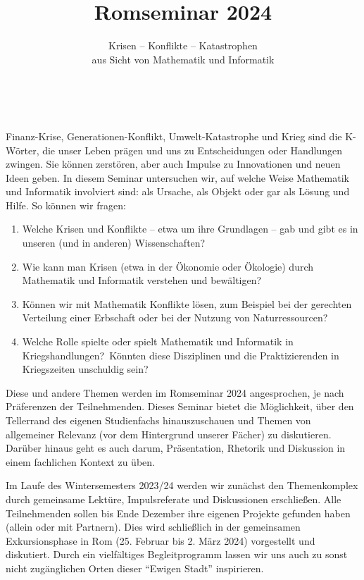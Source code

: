 \documentclass[%
	,ngerman				
	,DIV = 15				 
	]{scrartcl}
\title{Romseminar 2024}
\subtitle{Krisen -- Konflikte -- Katastrophen \\
aus Sicht von Mathematik und Informatik}
\date{}
\begin{document}
 
\maketitle


\thispagestyle{empty}
Finanz-Krise, Generationen-Konflikt, Umwelt-Katastrophe und Krieg sind die K-Wörter, die unser Leben prägen und uns zu Entscheidungen oder Handlungen zwingen. 
Sie können zerstören, aber auch Impulse zu Innovationen und neuen Ideen geben.
In diesem Seminar untersuchen wir, auf welche Weise Mathematik und Informatik involviert sind: als Ursache, als Objekt oder gar als Lösung und Hilfe. So können wir fragen:
%
\begin{enumerate}[$\bullet$]

\item
Welche Krisen und Konflikte -- etwa um ihre Grundlagen -- gab und gibt es in unseren (und in anderen) Wissenschaften? 

\item
Wie kann man Krisen (etwa in der Ökonomie oder Ökologie) durch Mathematik und Informatik verstehen und bewältigen?

\item
Können wir mit Mathematik Konflikte lösen, zum Beispiel bei der gerechten Verteilung einer Erbschaft oder bei der Nutzung von Naturressourcen?

\item
Welche Rolle spielte oder spielt Mathematik und Informatik in Kriegshandlungen? Könnten \mbox{diese} Disziplinen und die Praktizierenden in Kriegszeiten unschuldig sein?

\end{enumerate}
%
Diese und andere Themen werden im Romseminar 2024 angesprochen, je nach Präferenzen der Teilnehmenden. Dieses Seminar bietet die Möglichkeit, über den Tellerrand des eigenen Studienfachs hinauszuschauen und Themen von allgemeiner Relevanz (vor dem Hintergrund unserer Fächer) zu diskutieren. 
Darüber hinaus geht es auch darum, Präsentation, Rhetorik und Diskussion in einem fachlichen Kontext zu üben.

Im Laufe des Wintersemesters 2023/24 werden wir zunächst den Themenkomplex durch gemeinsame Lektüre, Impulsreferate und Diskussionen erschließen. 
Alle Teilnehmenden sollen bis Ende Dezember ihre eigenen Projekte gefunden haben (allein oder mit Partnern). 
Dies wird schließlich in der gemeinsamen Exkursionsphase in Rom (25. Februar bis 2. März 2024) vorgestellt und diskutiert. 
Durch ein vielfältiges Begleitprogramm lassen wir uns auch zu sonst nicht zugänglichen Orten dieser \enquote{Ewigen Stadt} inspirieren.
\end{document}
